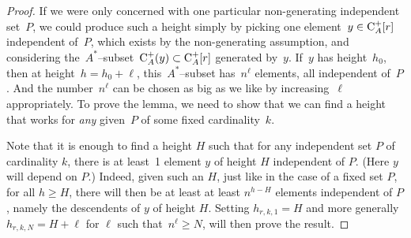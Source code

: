 \begin{proof}
If we were only concerned with one particular non-generating independent set~$P$, we could produce such a height simply by picking one element~$y\in \mathrm{C}_A^+[r]$ independent of~$P$, which exists by the non-generating assumption, and considering the~$A^*$--subset~$\mathrm{C}_A^+(y)\subset\mathrm{C}_A^+[r]$ generated by~$y$. If~$y$ has height~$h_0$, then at height~$h=h_0+\ell$, this~$A^*$--subset has~$n^\ell$ elements, all independent of~$P$. And the number~$n^\ell$ can be chosen as big as we like by increasing~$\ell$ appropriately. To prove the lemma, we need to show that we can find a height that works for {\em any} given~$P$ of some fixed cardinality~$k$. 


Note that it is enough to find a height $H$ such that for any independent set $P$ of cardinality $k$, there is at least~1 element $y$ of height $H$ independent of $P$. (Here $y$ will depend on $P$.)  Indeed, given such an $H$, just like in the case of a fixed set $P$, for all $h\ge H$, there will then be at least at least $n^{h-H}$ elements independent of $P$, namely the descendents of $y$ of height $H$. Setting $h_{r,k,1}=H$ and more generally $h_{r,k,N}=H+\ell$ for $\ell$ such that~\hbox{$n^\ell\ge N$}, will then prove the result. 



\end{proof}
